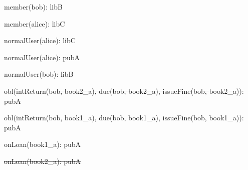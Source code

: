 \documentclass{article}
\begin{document}
{\begin{minipage}{\tableWidth}
\begin{description}[align=left,leftmargin=1em,noitemsep,labelsep=\parindent]
\item{{member(\allowbreak{}bob): libB}}
\item{{member(\allowbreak{}alice): libC}}
\item{{normalUser(\allowbreak{}alice): libC}}
\item{{normalUser(\allowbreak{}alice): pubA}}
\item{{normalUser(\allowbreak{}bob): libB}}
\item{\sout{obl(\allowbreak{}intReturn(\allowbreak{}bob, book2\_a), due(\allowbreak{}bob, book2\_a), issueFine(\allowbreak{}bob, book2\_a)): pubA}}
\item{{obl(\allowbreak{}intReturn(\allowbreak{}bob, book1\_a), due(\allowbreak{}bob, book1\_a), issueFine(\allowbreak{}bob, book1\_a)): pubA}}
\item{{onLoan(\allowbreak{}book1\_a): pubA}}
\item{\sout{onLoan(\allowbreak{}book2\_a): pubA}}
\end{description}\end{minipage}}
\end{document}
